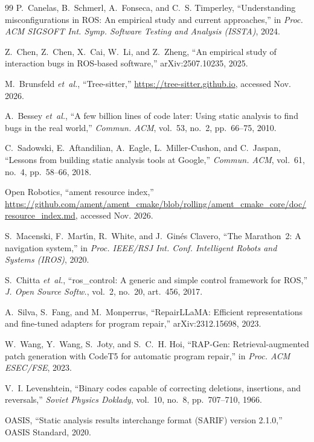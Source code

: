 \documentclass[conference]{IEEEtran}
\begin{document}
\begin{thebibliography}{99}
P.~Canelas, B.~Schmerl, A.~Fonseca, and C.~S. Timperley, ``Understanding misconfigurations in
{ROS}: An empirical study and current approaches,'' in \emph{Proc. ACM SIGSOFT Int. Symp.
Software Testing and Analysis (ISSTA)}, 2024.

Z.~Chen, Z.~Chen, X.~Cai, W.~Li, and Z.~Zheng, ``An empirical study of interaction bugs in
{ROS}-based software,'' arXiv:2507.10235, 2025.

M.~Brunsfeld \emph{et~al.}, ``Tree-sitter,'' \url{https://tree-sitter.github.io}, accessed Nov.
2026.

A.~Bessey \emph{et~al.}, ``A few billion lines of code later: Using static analysis to find bugs in the real world,'' \emph{Commun. ACM}, vol.~53, no.~2, pp.~66--75, 2010.

C.~Sadowski, E.~Aftandilian, A.~Eagle, L.~Miller-Cushon, and C.~Jaspan, ``Lessons from building static analysis tools at {Google},'' \emph{Commun. ACM}, vol.~61, no.~4, pp.~58--66, 2018.

Open Robotics, ``ament resource index,''
\url{https://github.com/ament/ament_cmake/blob/rolling/ament_cmake_core/doc/resource_index.md},
accessed Nov. 2026.

S.~Macenski, F.~Mart{\'\i}n, R.~White, and J.~Gin{\'e}s Clavero, ``The Marathon~2: A navigation system,'' in \emph{Proc. IEEE/RSJ Int. Conf. Intelligent Robots and Systems (IROS)}, 2020.

S.~Chitta \emph{et~al.}, ``ros\_control: A generic and simple control framework for {ROS},'' \emph{J. Open Source Softw.}, vol.~2, no.~20, art.~456, 2017.

A.~Silva, S.~Fang, and M.~Monperrus, ``{RepairLLaMA}: Efficient representations and fine-tuned
adapters for program repair,'' arXiv:2312.15698, 2023.

W.~Wang, Y.~Wang, S.~Joty, and S.~C.~H. Hoi, ``{RAP-Gen}: Retrieval-augmented patch generation
with {CodeT5} for automatic program repair,'' in \emph{Proc. ACM ESEC/FSE}, 2023.

V.~I. Levenshtein, ``Binary codes capable of correcting deletions, insertions, and reversals,'' \emph{Soviet Physics Doklady}, vol.~10, no.~8, pp.~707--710, 1966.

OASIS, ``Static analysis results interchange format ({SARIF}) version 2.1.0,'' OASIS Standard,
2020.


\end{thebibliography}
\end{document}

